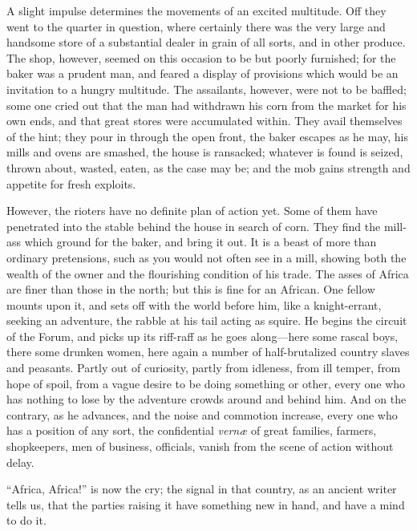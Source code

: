 A slight impulse determines the movements of an excited multitude.
Off they went to the quarter in question, where certainly there was
the very large and handsome store of a substantial dealer in grain of
all sorts, and in other produce. The shop, however, seemed on this
occasion to be but poorly furnished; for the baker was a prudent man,
and feared a display of provisions which would be an invitation to a
hungry multitude. The assailants, however, were not to be baffled;
some one cried out that the man had withdrawn his corn from the market
for his own ends, and that great stores were accumulated within. They
avail themselves of the hint; they pour in through the open front, the
baker escapes as he may, his mills and ovens are smashed, the house is
ransacked; whatever is found is seized, thrown about, wasted, eaten,
as the case may be; and the mob gains strength and appetite for fresh
exploits.

However, the rioters have no definite plan of action yet. Some of
them have penetrated into the stable behind the house in search of
corn. They find the mill-ass which ground for the baker, and bring it
out. It is a beast of more than ordinary pretensions, such as you
would not often see in a mill, showing both the wealth of the owner
and the flourishing condition of his trade. The asses of Africa are
finer than those in the north; but this is fine for an African. One
fellow mounts upon it, and sets off with the world before him, like a
knight-errant, seeking an adventure, the rabble at his tail acting as
squire. He begins the circuit of the Forum, and picks up its riff-raff
as he goes along—here some rascal boys, there some drunken women,
here again a number of half-brutalized country slaves and peasants.
Partly out of curiosity, partly from idleness, from ill temper, from
hope of spoil, from a vague desire to be doing something or other,
every one who has nothing to lose by the adventure crowds around and
behind him. And on the contrary, as he advances, and the noise and
commotion increase, every one who has a position of any sort, the
confidential \emph{vernæ} of great families, farmers, shopkeepers,
men of business, officials, vanish from the scene of action without
delay.

``Africa, Africa!'' is now the cry; the signal in that
country, as an ancient writer tells us, that the parties raising it
have something new in hand, and have a mind to do it.

